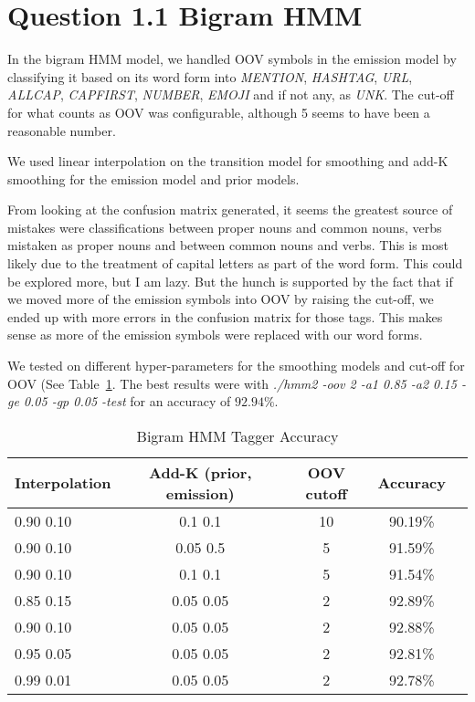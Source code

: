 \documentclass[11pt]{article}
\begin{document}
\section*{Question 1.1 Bigram HMM}

\bigskip

In the bigram  HMM model, we handled OOV symbols in the emission model by classifying it based on its word form into \textit{MENTION}, \textit{HASHTAG}, \textit{URL}, \textit{ALLCAP}, \textit{CAPFIRST}, \textit{NUMBER}, \textit{EMOJI} and if not any, as \textit{UNK}. The cut-off for what counts as OOV was configurable, although 5 seems to have been a reasonable number. 

\bigskip

We used linear interpolation on the transition model for smoothing and add-K smoothing for the emission model and prior models. 

\bigskip

From looking at the confusion matrix generated, it seems the greatest source of mistakes were classifications between proper nouns and common nouns, verbs mistaken as proper nouns and between common nouns and verbs. This is most likely due to the treatment of capital letters as part of the word form. This could be explored more, but I am lazy. But the hunch is supported by the fact that if we moved more of the emission symbols into OOV by raising the cut-off, we ended up with more errors in the confusion matrix for those tags. This makes sense as more of the emission symbols were replaced with our word forms.  

\bigskip

We tested on different hyper-parameters for the smoothing models and cut-off for OOV (See Table~\ref{tbl:hmm2}. The best results were with \textit{./hmm2 -oov 2 -a1 0.85 -a2 0.15 -ge 0.05 -gp 0.05 -test} for an accuracy of $92.94\%$.

\begin{table}
	\begin{center}
		\begin{tabular}{l|c|c|c|c|}
		\textbf{Interpolation} & \textbf{Add-K (prior, emission)} & \textbf{OOV cutoff} & \textbf{Accuracy} \\
		\hline
		0.90 0.10 & 0.1 0.1 & 10 & 90.19\% \\
		0.90 0.10 & 0.05 0.5 & 5 & 91.59\% \\
		0.90 0.10 & 0.1 0.1 & 5 & 91.54\% \\
		0.85 0.15 & 0.05 0.05 & 2 & 92.89\% \\
		0.90 0.10 & 0.05 0.05 & 2 & 92.88\% \\
		0.95 0.05 & 0.05 0.05 & 2 & 92.81\% \\
		0.99 0.01 & 0.05 0.05 & 2 & 92.78\%
		\end{tabular}\
		\caption{Bigram HMM Tagger Accuracy}
		\label{tbl:hmm2}
	\end{center}
\end{table}
\end{document}
